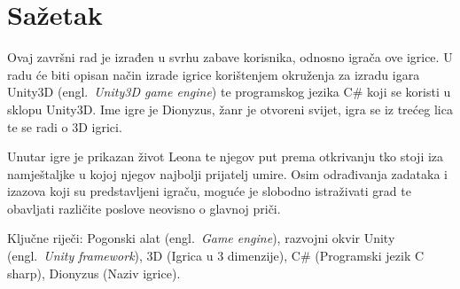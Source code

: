 \section*{Sažetak}
\label{sec:summary}
Ovaj završni rad je izrađen u svrhu zabave korisnika, odnosno igrača ove igrice.  U radu će biti opisan način izrade igrice korištenjem okruženja za izradu igara Unity3D (engl.~\textit{Unity3D game engine}) te programskog jezika C\# koji se koristi u sklopu Unity3D. Ime igre je Dionyzus, žanr je otvoreni svijet, igra se iz trećeg lica te se radi o 3D igrici. 

Unutar igre je prikazan život Leona te njegov put prema otkrivanju tko stoji iza namještaljke u kojoj njegov najbolji prijatelj umire. Osim odrađivanja zadataka i izazova koji su predstavljeni igraču, moguće je slobodno istraživati grad te obavljati različite poslove neovisno o glavnoj priči.

Ključne riječi: Pogonski alat (engl.~\textit{Game engine}), razvojni okvir Unity (engl.~\textit{Unity framework}), 3D (Igrica u 3 dimenzije), C\# (Programski jezik C sharp), Dionyzus (Naziv igrice).

